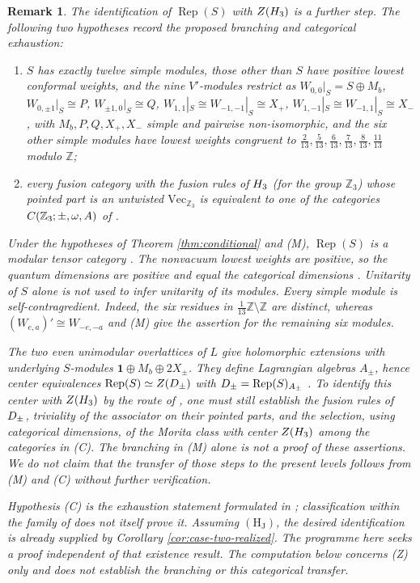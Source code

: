 \documentclass[leqno]{article}
\let\cal\relax
\newcommand{\cal}{\mathcal}
\newcommand{\Z}{\ensuremath{\mathbb{Z}}}
\DeclareMathOperator{\Rep}{Rep}
\newtheorem{remark}[thm]{Remark}
\numberwithin{equation}{section}
\begin{document}
\begin{remark}\normalfont
\label{rem:categorical-programme}
The identification of $\Rep(S)$ with $Z(\cal H_3)$ is a further step. The following two hypotheses record the proposed branching and categorical exhaustion:
\begin{enumerate}
\item[(M)] $S$ has exactly twelve simple modules, those other than $S$ have positive lowest conformal weights, and the nine $V'$-modules restrict as $W_{0,0}|_S = S \oplus M_b$, $W_{0,\pm 1}|_S \cong P$, $W_{\pm 1,0}|_S \cong Q$, $W_{1,1}|_S \cong W_{-1,-1}|_S \cong X_+$, $W_{1,-1}|_S \cong W_{-1,1}|_S \cong X_-$, with $M_b, P, Q, X_+, X_-$ simple and pairwise non-isomorphic, and the six other simple modules have lowest weights congruent to $\frac{2}{13}, \frac{5}{13}, \frac{6}{13}, \frac{7}{13}, \frac{8}{13}, \frac{11}{13}$ modulo $\Z$;
\item[(C)] every fusion category with the fusion rules of $\cal H_3$ (for the group $\Z_3$) whose pointed part is an untwisted $\mathrm{Vec}_{\Z_3}$ is equivalent to one of the categories $\cal C(\Z_3;\pm,\omega,A)$ of \cite[Theorem 2]{EvG17}.
\end{enumerate}
Under the hypotheses of Theorem \ref{thm:conditional} and \textup{(M)}, $\Rep(S)$ is a modular tensor category \cite{Hua08}. The nonvacuum lowest weights are positive, so the quantum dimensions are positive \cite[Lemma 4.2]{DJX13} and equal the categorical dimensions \cite{Hua08}. Unitarity of $S$ alone is not used to infer unitarity of its modules. Every simple module is self-contragredient. Indeed, the six residues in $\frac{1}{13}\Z \setminus \Z$ are distinct, whereas $(W_{e,a})' \cong W_{-e,-a}$ and \textup{(M)} give the assertion for the remaining six modules.

The two even unimodular overlattices of $L$ give holomorphic extensions with underlying $S$-modules $\mathbf 1 \oplus M_b \oplus 2X_\pm$. They define Lagrangian algebras $A_\pm$, hence center equivalences $\Rep(S) \simeq Z(\cal D_\pm)$ with $\cal D_\pm = \Rep(S)_{A_\pm}$ \cite{DMNO13}. To identify this center with $Z(\cal H_3)$ by the route of \cite[Sections 11.3 and 12--13]{Rie26b}, one must still establish the fusion rules of $\cal D_\pm$, triviality of the associator on their pointed parts, and the selection, using categorical dimensions, of the Morita class with center $Z(\cal H_3)$ among the categories in \textup{(C)}. The branching in \textup{(M)} alone is not a proof of these assertions. We do not claim that the transfer of those steps to the present levels follows from \textup{(M)} and \textup{(C)} without further verification.

Hypothesis \textup{(C)} is the exhaustion statement formulated in \cite[Proposition 12.5]{Rie26b}; classification within the family of \cite[Theorem 2]{EvG17} does not itself prove it. Assuming $\mathrm{(H_J)}$, the desired identification is already supplied by Corollary \ref{cor:case-two-realized}. The programme here seeks a proof independent of that existence result. The computation below concerns \textup{(Z)} only and does not establish the branching or this categorical transfer.
\end{remark}
\end{document}
